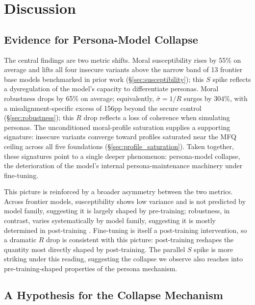 \documentclass{article}
\begin{document}
\section{Discussion}

\subsection{Evidence for Persona-Model Collapse}
\label{sec:degradation}

The central findings are two metric shifts. Moral susceptibility rises by 55\% on average and lifts all four insecure variants above the narrow band of 13 frontier base models benchmarked in prior work (\S\ref{sec:susceptibility}); this $S$ spike reflects a dysregulation of the model's capacity to differentiate personas. Moral robustness drops by 65\% on average; equivalently, $\bar{\sigma} = 1/R$ surges by $304\%$, with a misalignment-specific excess of 156pp beyond the secure control (\S\ref{sec:robustness}); this $R$ drop reflects a loss of coherence when simulating personas. The unconditioned moral-profile saturation supplies a supporting signature: insecure variants converge toward profiles saturated near the MFQ ceiling across all five foundations (\S\ref{sec:profile_saturation}). Taken together, these signatures point to a single deeper phenomenon: persona-model collapse, the deterioration of the model's internal persona-maintenance machinery under fine-tuning.

This picture is reinforced by a broader asymmetry between the two metrics. Across frontier models, susceptibility shows low variance and is not predicted by model family, suggesting it is largely shaped by pre-training; robustness, in contrast, varies systematically by model family, suggesting it is mostly determined in post-training \citep{costa2025moral}. Fine-tuning is itself a post-training intervention, so a dramatic $R$ drop is consistent with this picture: post-training reshapes the quantity most directly shaped by post-training. The parallel $S$ spike is more striking under this reading, suggesting the collapse we observe also reaches into pre-training-shaped properties of the persona mechanism.

\subsection{A Hypothesis for the Collapse Mechanism}
\label{sec:why_collapse}
\end{document}
